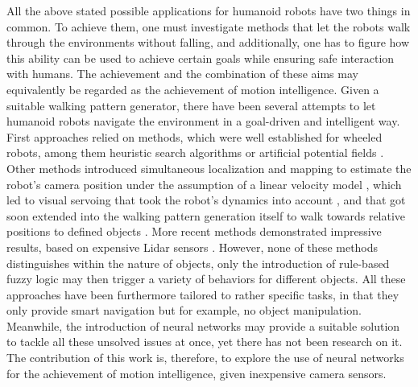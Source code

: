 All the above stated possible applications for humanoid robots have two things in common. To achieve them, one must investigate methods that let the robots walk through the environments without falling, and additionally, one has to figure how this ability can be used to achieve certain goals while ensuring safe interaction with humans. The achievement and the combination of these aims may equivalently be regarded as the achievement of motion intelligence. Given a suitable walking pattern generator, there have been several attempts to let humanoid robots navigate the environment in a goal-driven and intelligent way. First approaches relied on methods, which were well established for wheeled robots, among them heuristic search algorithms or artificial potential fields \cite{kuffner2005motion}. Other methods introduced simultaneous localization and mapping to estimate the robot's camera position under the assumption of a linear velocity model \cite{stasse2008integrating}, which led to visual servoing that took the robot's dynamics into account \cite{dune2010cancelling}, and that got soon extended into the walking pattern generation itself to walk towards relative positions to defined objects \cite{dune2011vision}. More recent methods demonstrated impressive results, based on expensive Lidar sensors \cite{griffin2019footstep}. However, none of these methods distinguishes within the nature of objects, only the introduction of rule-based fuzzy logic \cite{dadios2012humanoid} may then trigger a variety of behaviors for different objects. All these approaches have been furthermore tailored to rather specific tasks, in that they only provide smart navigation but for example, no object manipulation. Meanwhile, the introduction of neural networks may provide a suitable solution to tackle all these unsolved issues at once, yet there has not been research on it. The contribution of this work is, therefore, to explore the use of neural networks for the achievement of motion intelligence, given inexpensive camera sensors.
\\\\
